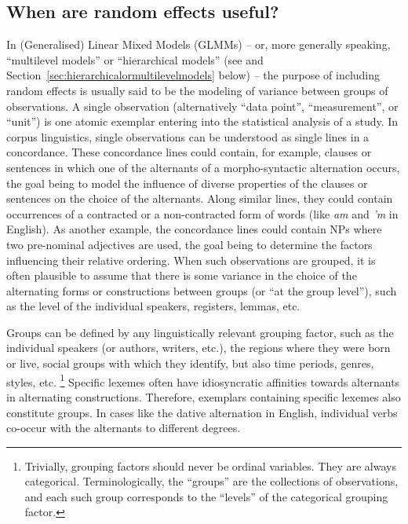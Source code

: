 \subsection{When are random effects useful?}
\label{sec:whenrandomeffectsareuseful}

In (Generalised) Linear Mixed Models (GLMMs) -- or, more generally speaking, ``multilevel models'' or ``hierarchical models'' (see \citealp{GelmanHill2007} and Section~\ref{sec:hierarchicalormultilevelmodels} below) -- the purpose of including random effects is usually said to be the modeling of variance between groups of observations.
A single observation (alternatively ``data point'', ``measurement'', or ``unit'') is one atomic exemplar entering into the statistical analysis of a study.
In corpus linguistics, single observations can be understood as single lines in a concordance.
These concordance lines could contain, for example, clauses or sentences in which one of the alternants of a morpho-syntactic alternation occurs, the goal being to model the influence of diverse properties of the clauses or sentences on the choice of the alternants.
Along similar lines, they could contain occurrences of a contracted or a non-contracted form of words (like \textit{am} and \textit{'m} in English).
As another example, the concordance lines could contain NPs where two pre-nominal adjectives are used, the goal being to determine the factors influencing their relative ordering.
When such observations are grouped, it is often plausible to assume that there is some variance in the choice of the alternating forms or constructions between groups (or ``at the group level''), such as the level of the individual speakers, registers, lemmas, etc.

Groups can be defined by any linguistically relevant grouping factor, such as the individual speakers (or authors, writers, etc.), the regions where they were born or live, social groups with which they identify, but also time periods, genres, styles, etc.%
\footnote{Trivially, grouping factors should never be ordinal variables.
They are always categorical.
Terminologically, the ``groups'' are the collections of observations, and each such group corresponds to the ``levels'' of the categorical grouping factor.}
Specific lexemes often have idiosyncratic affinities towards alternants in alternating constructions.
Therefore, exemplars containing specific lexemes also constitute groups.
In cases like the dative alternation in English, individual verbs co-occur with the alternants to different degrees.

